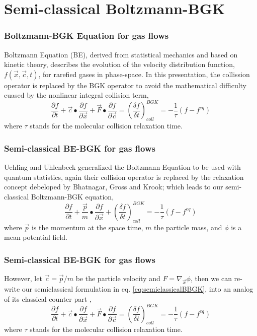 \section{Semi-classical Boltzmann-BGK}

\begin{frame}
	\frametitle{Boltzmann-BGK Equation for gas flows}
	Boltzmann Equation (BE), derived from statistical mechanics and based on kinetic theory, describes the evolution of the velocity distribution function, $f(\vec{x},\vec{c},t)$, for rarefied gases in phase-space. In this presentation, the collission operator is replaced by the BGK operator to avoid the mathematical difficulty cuased by the nonlinear integral collision term,
	\begin{equation}
	\frac{\partial{f}}{\partial{t}} +
	\vec{c}\bullet\frac{\partial{f}}{\partial{\vec{x}}} +
	\vec{F}\bullet\frac{\partial{f}}{\partial{\vec{c}}} = 
	\left( \frac{\delta f}{\delta t}\right )^{BGK}_{coll} = -\frac{1}{\tau}(f-f^{eq})
	\label{eq:classicalBBGK}
	\end{equation}
	where $\tau$ stands for the molecular collision relaxation time.
\end{frame}

\begin{frame}
	\frametitle{Semi-classical BE-BGK for gas flows}
	Uehling and Uhlenbeck \cite{PhysRev.43.552} generalized the Boltzmann Equation to be used with quantum statistics, again their collision operator is replaced by the relaxation concept debeloped by Bhatnagar, Gross and Krook; which leads to our semi-classical Boltzmann-BGK equation,
	\begin{equation}
	\frac{\partial{f}}{\partial{t}} +
	\frac{\vec{p}}{m}\bullet\frac{\partial f}{\partial \vec{x}} +
	\left( \frac{\delta f}{\delta t}\right )^{BGK}_{coll} = -\frac{1}{\tau}(f-f^{eq})
	\label{eq:semiclassicalBBGK}
	\end{equation}
	where $\vec{p}$ is the momentum at the space time, $m$ the particle mass, and $\phi$ is a mean potential field.
\end{frame}

\begin{frame}
	\frametitle{Semi-classical BE-BGK for gas flows}
	However, let $\vec{c} = \vec{p} / m$ be the particle velocity and $F = \nabla_{\vec{x}} \phi$, then we can re-write our semiclassical formulation in eq. \ref{eq:semiclassicalBBGK}, into an analog of its classical counter part \cite{Yang2013},
	\begin{equation}
	\frac{\partial{f}}{\partial{t}} +
	\vec{c}\bullet\frac{\partial{f}}{\partial{\vec{x}}} +
	\vec{F}\bullet\frac{\partial{f}}{\partial{\vec{c}}} = 
	\left( \frac{\delta f}{\delta t}\right )^{BGK}_{coll} = -\frac{1}{\tau}(f-f^{eq})
	\end{equation}
	where $\tau$ stands for the molecular collision relaxation time.
\end{frame}

